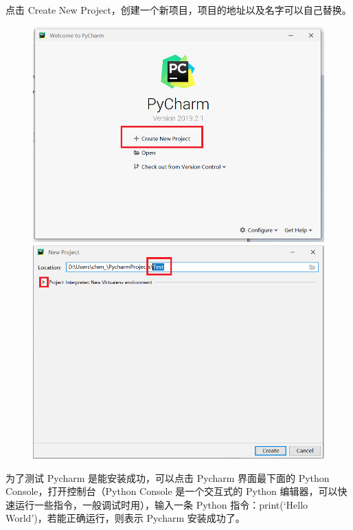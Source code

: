 点击 Create New Project，创建一个新项目，项目的地址以及名字可以自己替换。

\begin{figure}[!ht]
  \centering
  \includegraphics[scale=0.4]{figure/chapter1/pycharm13.png}\quad
  \includegraphics[scale=0.4]{figure/chapter1/pycharm14.png}
\end{figure}

%
%


为了测试 Pycharm 是能安装成功，可以点击 Pycharm 界面最下面的 Python Console，打开控制台（Python Console 是一个交互式的 Python 编辑器，可以快速运行一些指令，一般调试时用），输入一条 Python 指令：print(`Hello World')，若能正确运行，则表示 Pycharm 安装成功了。

